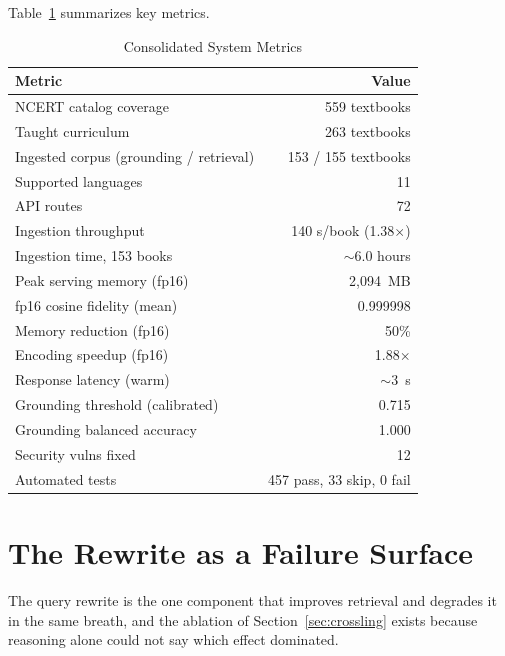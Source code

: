 Table~\ref{tab:results} summarizes key metrics.

\begin{table}
\caption{Consolidated System Metrics}
\label{tab:results}
\centering
\begin{tabular}{@{}lr@{}}
\toprule
\textbf{Metric} & \textbf{Value} \\
\midrule
NCERT catalog coverage & 559 textbooks \\
Taught curriculum & 263 textbooks \\
Ingested corpus (grounding / retrieval) & 153 / 155 textbooks \\
Supported languages & 11 \\
API routes & 72 \\
Ingestion throughput & 140 s/book (1.38$\times$) \\
Ingestion time, 153 books & ${\sim}6.0$ hours \\
Peak serving memory (fp16) & 2,094~MB \\
fp16 cosine fidelity (mean) & 0.999998 \\
Memory reduction (fp16) & 50\% \\
Encoding speedup (fp16) & 1.88$\times$ \\
Response latency (warm) & ${\sim}3$~s \\
Grounding threshold (calibrated) & 0.715 \\
Grounding balanced accuracy & 1.000 \\
Security vulns fixed & 12 \\
Automated tests & 457 pass, 33 skip, 0 fail \\
\bottomrule
\end{tabular}
\end{table}

\fi
\ifconf\else  %
\section{The Rewrite as a Failure Surface}
\label{sec:rewrite}

The query rewrite is the one component that improves retrieval and degrades it in the same breath, and the ablation of Section~\ref{sec:crossling} exists because reasoning alone could not say which effect dominated.

